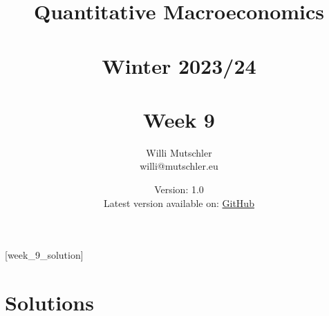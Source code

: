 
\newif\ifDisplaySolutions\DisplaySolutionstrue


\title{Quantitative Macroeconomics\\~\\Winter 2023/24\\~\\Week 9}
\author{Willi Mutschler\\willi@mutschler.eu}
\date{Version: 1.0\\Latest version available on: \href{https://github.com/wmutschl/Quantitative-Macroeconomics/releases/latest/download/week_9.pdf}{GitHub}}
\maketitle\thispagestyle{empty}

\newpage
{}[week_9_solution]
\tableofcontents\thispagestyle{empty}\newpage

\setcounter{page}{1}
\newpage
\newpage
\newpage

\printbibliography%
\newpage

\ifDisplaySolutions%
\newpage
\appendix
\section{Solutions}

\fi
